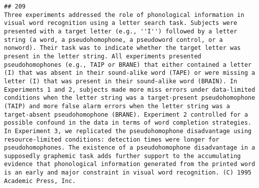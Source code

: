 \documentclass[
  english,
  man]{apa6}
\begin{document}
\begin{verbatim}
## 209                                                                                                                                                                                                                                                                                                                                                                                                                                                                                                                                                                                                                                                                                                                                                                                                                                                                                                                                                                                                                                                                                                                                                                                                                                                  Three experiments addressed the role of phonological information in visual word recognition using a letter search task. Subjects were presented with a target letter (e.g., ''I'') followed by a letter string (a word, a pseudohomophone, a pseudoword control, or a nonword). Their task was to indicate whether the target letter was present in the letter string. All experiments presented pseudohomophones (e.g., TAIP or BRANE) that either contained a letter (I) that was absent in their sound-alike word (TAPE) or were missing a letter (I) that was present in their sound-alike word (BRAIN). In Experiments 1 and 2, subjects made more miss errors under data-limited conditions when the letter string was a target-present pseudohomophone (TAIP) and more false alarm errors when the letter string was a target-absent pseudohomophone (BRANE). Experiment 2 controlled for a possible confound in the data in terms of word completion strategies. In Experiment 3, we replicated the pseudohomophone disadvantage using resource-limited conditions: detection times were longer for pseudohomophones. The existence of a pseudohomophone disadvantage in a supposedly graphemic task adds further support to the accumulating evidence that phonological information generated from the printed word is an early and major constraint in visual word recognition. (C) 1995 Academic Press, Inc.

\end{verbatim}
\end{document}
